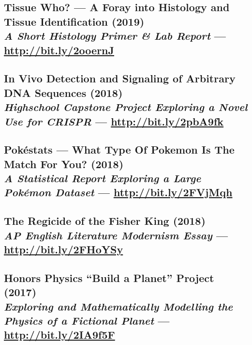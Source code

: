 \documentclass[twocolumn, a4paper, fontsize=9pt, headsepline, footsepline]{scrartcl}
\begin{document}
\subsection*{Tissue Who? — A Foray into Histology and Tissue Identification
  (2019)\\\textmd{\emph{A Short Histology Primer \& Lab Report} —
    \url{http://bit.ly/2ooernJ}}}

\subsection*{In Vivo Detection and Signaling of Arbitrary DNA Sequences
  (2018)\\\textmd{\emph{Highschool Capstone Project Exploring a Novel Use for
    CRISPR} — \url{http://bit.ly/2pbA9fk}}}

\subsection*{Pokéstats — What Type Of Pokemon Is The Match For You?
  (2018)\\\textmd{\emph{A Statistical Report Exploring a Large Pokémon Dataset} — \url{http://bit.ly/2FVjMqh}}}

\subsection*{The Regicide of the Fisher King (2018)\\\textmd{\emph{AP English
    Literature Modernism Essay} — \url{http://bit.ly/2FHoYSy}}}

\subsection*{Honors Physics “Build a Planet” Project (2017)\\\textmd{\emph{Exploring and
    Mathematically Modelling the Physics of a Fictional Planet} — \url{http://bit.ly/2IA9f5F}}}


\end{document}
